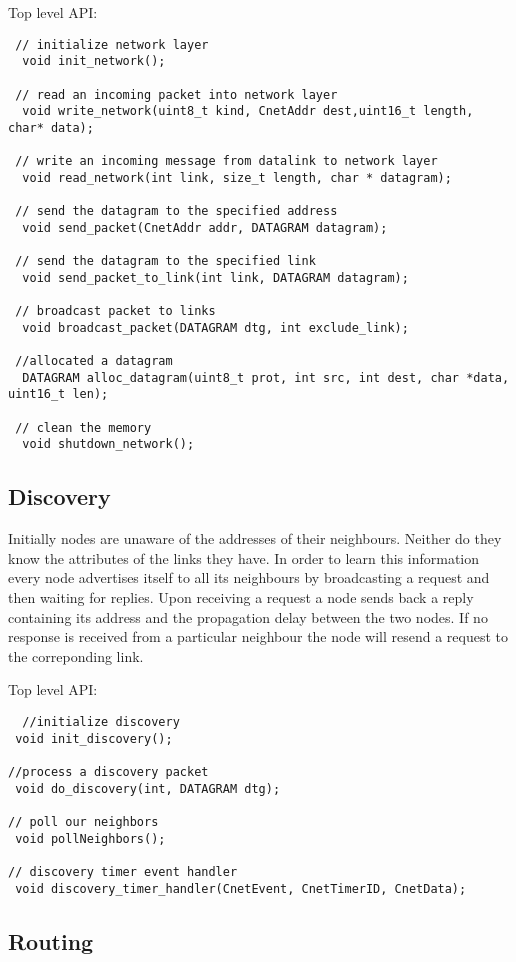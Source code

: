 \documentclass[11pt,a4paper,oneside]{report}
\begin{document}
    
Top level API:
    
   \begin{lstlisting}
 // initialize network layer
  void init_network();

 // read an incoming packet into network layer
  void write_network(uint8_t kind, CnetAddr dest,uint16_t length, char* data);

 // write an incoming message from datalink to network layer
  void read_network(int link, size_t length, char * datagram);

 // send the datagram to the specified address
  void send_packet(CnetAddr addr, DATAGRAM datagram);

 // send the datagram to the specified link
  void send_packet_to_link(int link, DATAGRAM datagram);

 // broadcast packet to links
  void broadcast_packet(DATAGRAM dtg, int exclude_link);

 //allocated a datagram
  DATAGRAM alloc_datagram(uint8_t prot, int src, int dest, char *data, uint16_t len);

 // clean the memory
  void shutdown_network();

  \end{lstlisting}  
            

\subsection*{Discovery}
Initially nodes are unaware of the addresses of their neighbours. Neither do they know the
attributes of the links they have. In order to learn this information every node advertises
itself to all its neighbours by broadcasting a request and then waiting for replies. Upon receiving 
a request a node sends back a reply containing its address and the propagation delay between the
two nodes. If no response is received from a particular neighbour the node will resend a request to the 
correponding link. 
    
Top level API: 
  \begin{lstlisting}
  //initialize discovery
 void init_discovery();

//process a discovery packet
 void do_discovery(int, DATAGRAM dtg);

// poll our neighbors
 void pollNeighbors();

// discovery timer event handler
 void discovery_timer_handler(CnetEvent, CnetTimerID, CnetData);
\end{lstlisting}
\subsection*{Routing}
\end{document}
